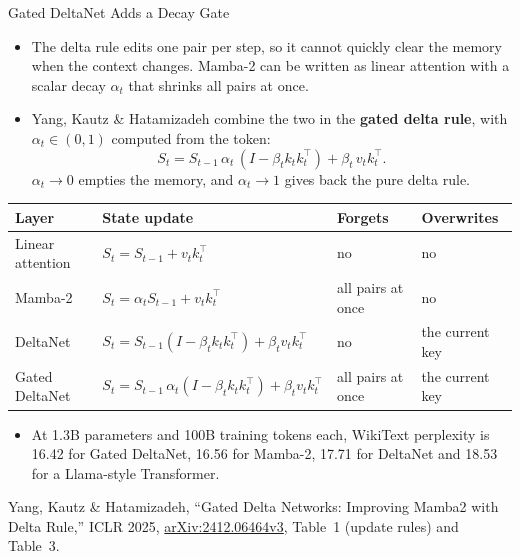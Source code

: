 \begin{frame}{Gated DeltaNet Adds a Decay Gate}
  \begin{itemize}\footnotesize\itemsep0.3em
    \item[\textcolor{red}{$\blacktriangleright$}] The delta rule edits one pair per step, so it cannot quickly clear the memory when the context changes. Mamba-2 can be written as linear attention with a scalar decay $\alpha_t$ that shrinks all pairs at once.
    \item[\textcolor{red}{$\blacktriangleright$}] Yang, Kautz \& Hatamizadeh combine the two in the \textbf{gated delta rule}, with $\alpha_t \in (0,1)$ computed from the token:
      \[ S_t = S_{t-1}\,\alpha_t\,(I - \beta_t k_t k_t^\top) + \beta_t\, v_t k_t^\top. \]
      $\alpha_t \to 0$ empties the memory, and $\alpha_t \to 1$ gives back the pure delta rule.
  \end{itemize}
  \vspace{0.1em}
  {\centering\scriptsize
  \begin{tabular}{p{2.4cm} p{5.2cm} p{2.0cm} p{2.0cm}}
    \toprule
    \textbf{Layer} & \textbf{State update} & \textbf{Forgets} & \textbf{Overwrites} \\
    \midrule
    Linear attention & $S_t = S_{t-1} + v_t k_t^\top$ & no & no \\
    Mamba-2 & $S_t = \alpha_t S_{t-1} + v_t k_t^\top$ & all pairs at once & no \\
    DeltaNet & $S_t = S_{t-1}(I - \beta_t k_t k_t^\top) + \beta_t v_t k_t^\top$ & no & the current key \\
    Gated DeltaNet & $S_t = S_{t-1}\,\alpha_t(I - \beta_t k_t k_t^\top) + \beta_t v_t k_t^\top$ & all pairs at once & the current key \\
    \bottomrule
  \end{tabular}\par}
  \vspace{0.2em}
  \begin{itemize}\footnotesize
    \item[\textcolor{red}{$\blacktriangleright$}] At 1.3B parameters and 100B training tokens each, WikiText perplexity is 16.42 for Gated DeltaNet, 16.56 for Mamba-2, 17.71 for DeltaNet and 18.53 for a Llama-style Transformer.
  \end{itemize}
  \vspace{0.1em}
  {\scriptsize Yang, Kautz \& Hatamizadeh, ``Gated Delta Networks: Improving Mamba2 with Delta Rule,'' ICLR 2025, \href{https://arxiv.org/abs/2412.06464v3}{arXiv:2412.06464v3}, Table~1 (update rules) and Table~3.}
\end{frame}

